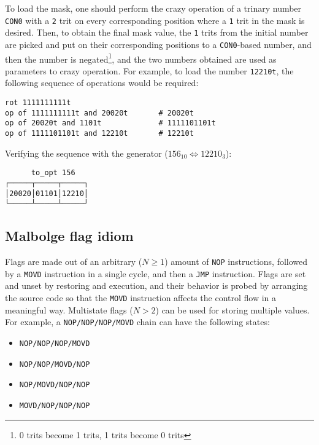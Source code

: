 \par To load the mask, one should perform the crazy operation of a trinary number \verb|CON0| with a \verb|2| trit on every corresponding position where a \verb|1| trit in the mask is desired. Then, to obtain the final mask value, the \verb|1| trits from the initial number are picked and put on their corresponding positions to a \verb|CON0|-based number, and then the number is negated\footnote{0 trits become 1 trits, 1 trits become 0 trits}, and the two numbers obtained are used as parameters to crazy operation. For example, to load the number \verb|12210t|, the following sequence of operations would be required:

\begin{verbatim}
rot 1111111111t
op of 1111111111t and 20020t       # 20020t
op of 20020t and 1101t             # 1111101101t
op of 1111101101t and 12210t       # 12210t
\end{verbatim}

\par Verifying the sequence with the generator ($156_{10} \Leftrightarrow 12210_3$):

\begin{verbatim}
      to_opt 156
┌─────┬─────┬─────┐
│20020│01101│12210│
└─────┴─────┴─────┘
\end{verbatim}

\subsection{Malbolge flag idiom}

\par Flags are made out of an arbitrary ($N \geq 1$) amount of \verb|NOP| instructions, followed by a \verb|MOVD| instruction in a single cycle, and then a \verb|JMP| instruction. Flags are set and unset by restoring and execution, and their behavior is probed by arranging the source code so that the \verb|MOVD| instruction affects the control flow in a meaningful way. Multistate flags ($N > 2$) can be used for storing multiple values. For example, a \verb|NOP/NOP/NOP/MOVD| chain can have the following states:

\begin{itemize}
    \item \verb|NOP/NOP/NOP/MOVD|
    \item \verb|NOP/NOP/MOVD/NOP|
    \item \verb|NOP/MOVD/NOP/NOP|
    \item \verb|MOVD/NOP/NOP/NOP|
\end{itemize}

